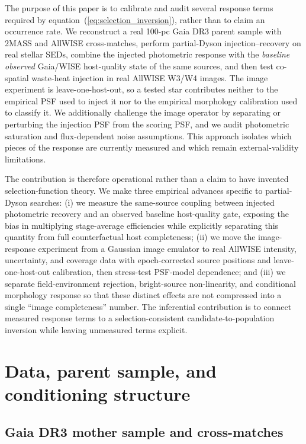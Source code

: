 \documentclass[fleqn,usenatbib]{mnras}
\begin{document}
The purpose of this paper is to calibrate and audit several response terms required by equation~(\ref{eq:selection_inversion}), rather than to claim an occurrence rate. We reconstruct a real 100-pc Gaia DR3 parent sample with 2MASS and AllWISE cross-matches, perform partial-Dyson injection--recovery on real stellar SEDs, combine the injected photometric response with the \emph{baseline observed} Gaia/WISE host-quality state of the same sources, and then test co-spatial waste-heat injection in real AllWISE W3/W4 images. The image experiment is leave-one-host-out, so a tested star contributes neither to the empirical PSF used to inject it nor to the empirical morphology calibration used to classify it. We additionally challenge the image operator by separating or perturbing the injection PSF from the scoring PSF, and we audit photometric saturation and flux-dependent noise assumptions. This approach isolates which pieces of the response are currently measured and which remain external-validity limitations.

The contribution is therefore operational rather than a claim to have invented selection-function theory. We make three empirical advances specific to partial-Dyson searches: (i) we measure the same-source coupling between injected photometric recovery and an observed baseline host-quality gate, exposing the bias in multiplying stage-average efficiencies while explicitly separating this quantity from full counterfactual host completeness; (ii) we move the image-response experiment from a Gaussian image emulator to real AllWISE intensity, uncertainty, and coverage data with epoch-corrected source positions and leave-one-host-out calibration, then stress-test PSF-model dependence; and (iii) we separate field-environment rejection, bright-source non-linearity, and conditional morphology response so that these distinct effects are not compressed into a single ``image completeness'' number. The inferential contribution is to connect measured response terms to a selection-consistent candidate-to-population inversion while leaving unmeasured terms explicit.

\section{Data, parent sample, and conditioning structure}
\label{sec:data}

\subsection{Gaia DR3 mother sample and cross-matches}
\end{document}
